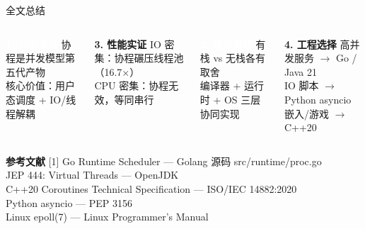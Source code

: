 \begin{frame}{全文总结}
  \begin{columns}[T]
    \begin{block}{\textcolor{white}{\textbf{1. 并发演进}}}
      \color{white}
      协程是并发模型第五代产物\\
      核心价值：用户态调度 + IO/线程解耦
    \end{block}

    \vspace{0.3em}

    \begin{exampleblock}{\textbf{3. 性能实证}}
      IO 密集：协程碾压线程池（16.7$\times$）\\
      CPU 密集：协程无效，等同串行
    \end{exampleblock}

    \begin{block}{\textcolor{white}{\textbf{2. 技术原理}}}
      \color{white}
      有栈 vs 无栈各有取舍\\
      编译器 + 运行时 + OS 三层协同实现
    \end{block}

    \vspace{0.3em}

    \begin{exampleblock}{\textbf{4. 工程选择}}
      高并发服务 $\rightarrow$ Go / Java 21\\
      IO 脚本 $\rightarrow$ Python asyncio\\
      嵌入/游戏 $\rightarrow$ C++20
    \end{exampleblock}
  \end{columns}

  \vspace{0.8em}

  \textbf{参考文献}
  \vspace{0.2em}
  {\footnotesize
  [1] Go Runtime Scheduler --- Golang 源码 src/runtime/proc.go\\
  [2] JEP 444: Virtual Threads --- OpenJDK\\
  [3] C++20 Coroutines Technical Specification --- ISO/IEC 14882:2020\\
  [4] Python asyncio --- PEP 3156\\
  [5] Linux epoll(7) --- Linux Programmer's Manual}
\end{frame}

